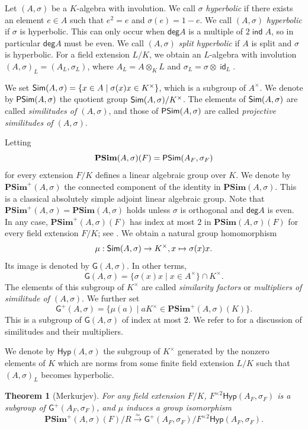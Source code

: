 \documentclass[twoside,11pt]{amsart}
\numberwithin{equation}{section}
\newtheorem{thm}[equation]{Theorem}
\theoremstyle{definition}
\renewcommand{\deg}{\mathsf{deg}}
\newcommand\ind{\operatorname{\mathsf{ind}}}
\newcommand\id{\operatorname{\mathsf{id}}}
\newcommand{\mg}[1]{{#1}^{\times}}
\newcommand{\sq}[1]{{#1}^{\times 2}}
\newcommand{\s}{\sigma}
\newcommand{\Sim}{{\bf\mathsf{Sim}}}
\newcommand{\PSim}{{\bf\mathsf{PSim}}}
\newcommand{\G}{\mathsf{G}}
\newcommand{\Hyp}{\mathsf{Hyp}}
\begin{document}
Let $(A,\s)$ be a $K$-algebra with involution. We call $\s$ \emph{hyperbolic} if there exists an element $e\in A$ such that $e^2=e$ and $\s(e)=1-e$. 
We call
$(A,\s)$ \emph{hyperbolic} if $\s$ is hyperbolic.
This can only occur when $\deg A$ is a multiple of $2\ind A$, so in particular $\deg A$ must be even.
We call $(A,\s)$ \emph{split hyperbolic} if $A$ is split and $\s$ is hyperbolic.
For a field extension $L/K$, we obtain an $L$-algebra with involution $(A,\s)_L=(A_L,\s_L)$, where $A_L=A\otimes_KL$ and $\s_L=\s\otimes\id_L$.

We set $\Sim(A,\s)=\{x\in A\mid \s(x)x\in \mg{K}\}$, which is a subgroup of $\mg{A}$. 
We 
denote by $\PSim(A,\s)$ the quotient group $\Sim(A,\s)/\mg{K}$.
The elements of $\Sim(A,\s)$ are called \emph{similitudes of $(A,\s)$}, and those of $\PSim(A,\s)$ are called \emph{projective similitudes of $(A,\s)$}.

Letting 
$$\mathbf{PSim}(A,\s)(F)=\PSim(A_{F},\s_{F})$$
for every extension $F/K$ defines a linear algebraic group over $K$. We denote by $\mathbf{PSim}^+ (A, \sigma)$ the connected component of the identity in 
$\mathbf{PSim} (A,\sigma)$. 
This is a classical absolutely simple adjoint linear algebraic group.
Note that $\mathbf{PSim}^{+}(A,\s)=\mathbf{PSim}(A,\s)$ holds unless $\s$ is orthogonal and $\deg A$ is even.
In any case, $\mathbf{PSim}^+(A,\s)(F)$ has index at most $2$ in $\mathbf{PSim} (A,\s)(F)$ for every field extension $F/K$; see \cite[Prop. 12.23]{KMRT98}.
We obtain a natural group homomorphism 
$$\mu:\Sim(A,\s)\to \mg{K}, x\mapsto \s(x)x.$$
Its image is denoted by $\G(A,\s)$. In other terms,
 $$\G(A,\s)=\{\s(x)x\mid x\in\mg{A}\}\cap\mg{K}.$$
 The elements of this subgroup of $\mg{K}$ are called \emph{similarity factors} or \emph{multipliers of similitude of $(A,\s)$}.
We further set
$$\G^+(A,\s)=\{\mu(a)\mid a\mg{K}\in\mathbf{PSim}^+(A,\s)(K)\}.$$
This is a subgroup of $\G(A,\s)$ of index at most $2$.
We refer to \cite[\S12]{KMRT98} for a discussion of similitudes and their multipliers.

We denote by $\Hyp(A,\s)$ the subgroup of $\mg{K}$ generated by the nonzero elements of $K$ which are norms from some finite field extension $L/K$ such that $(A,\s)_L$ becomes hyperbolic.

\begin{thm}[Merkurjev]
\label{Mer:T1} 
For any field extension $F/K$, $\sq{F}\Hyp(A_{F},\s_{F})$ is a subgroup of $\G^+(A_{F},\s_{F})$, and $\mu$ induces a group isomorphism 
$$\mathbf{PSim}^+(A,\s)(F)/R\stackrel{\simeq}{\longrightarrow} \G^+(A_{F},\s_{F})/\sq{F}\Hyp(A_{F},\s_{F}).$$
\end{thm}
\end{document}
